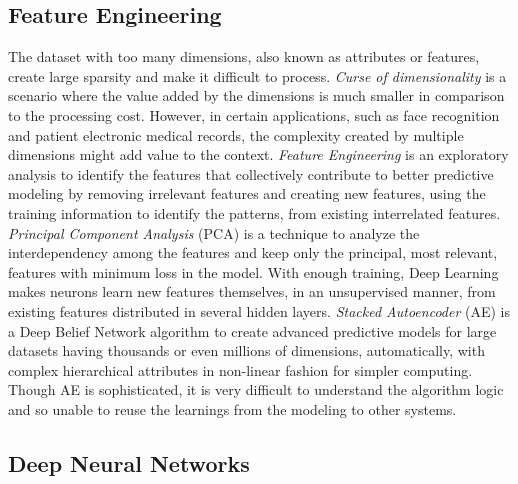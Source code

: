 \documentclass[sigconf]{acmart}
\begin{document}
	\subsection{Feature Engineering}
	
	The dataset with too many dimensions, also known as attributes or features, create large sparsity and make it difficult to process. {\em Curse of dimensionality} is a scenario where the value added by the dimensions is much smaller in comparison to the processing cost. However, in certain applications, such as face recognition and patient electronic medical records, the complexity created by multiple dimensions might add value to the context. {\em Feature Engineering} is an exploratory analysis to identify the features that collectively contribute to better predictive modeling by removing irrelevant features and creating new features, using the training information to identify the patterns, from existing interrelated features. {\em Principal Component Analysis} (PCA) is a technique to analyze the interdependency among the features and keep only the principal, most relevant, features with minimum loss in the model. With enough training, Deep Learning makes neurons learn new features themselves, in an unsupervised manner, from existing features distributed in several hidden layers. {\em Stacked Autoencoder} (AE) is a Deep Belief Network algorithm to create advanced predictive models for large datasets having thousands or even millions of dimensions, automatically, with complex hierarchical attributes in non-linear fashion for simpler computing. Though AE is sophisticated, it is very difficult to understand the algorithm logic and so unable to reuse the learnings from the modeling to other systems. 
		
	
	\subsection{Deep Neural Networks}
	
\end{document}
